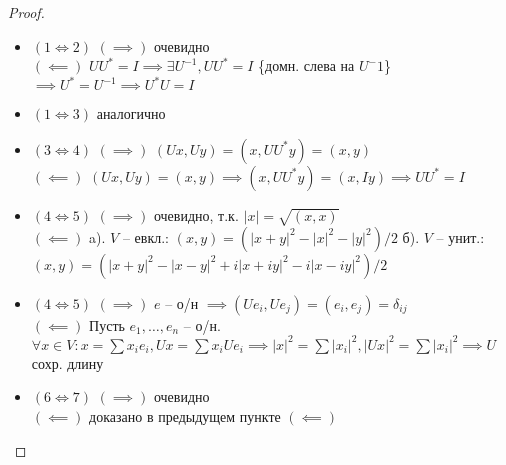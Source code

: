 \begin{proof}
\begin{itemize}
\item $(1\Leftrightarrow 2)$ $(\implies)$ очевидно \\ $(\impliedby)$ $UU^*=I \implies \exists U^{-1}, UU^*=I$ \{домн. слева на $U^-1$\} $\implies U^*=U^{-1} \implies U^*U=I$ \\
\item $(1\Leftrightarrow 3)$ аналогично \\
\item $(3\Leftrightarrow 4)$ $(\implies)$ $(Ux, Uy)=(x,UU^*y)=(x,y)$ \\ $(\impliedby)$ $(Ux,Uy)=(x,y) \implies (x,UU^*y)=(x,Iy) \implies UU^*=I$ \\
\item $(4\Leftrightarrow 5)$ $(\implies)$ очевидно, т.к. $\left|x\right|=\sqrt{(x,x)}$ \\ $(\impliedby)$ a). $V$ -- евкл.: $(x,y)=(\left|x+y\right|^2-\left|x\right|^2-\left|y\right|^2)/2$ б). $V$ -- унит.: $(x,y)=(\left|x+y\right|^2-\left|x-y\right|^2+i\left|x+iy\right|^2-i\left|x-iy\right|^2)/2$ \\
\item $(4\Leftrightarrow 5)$ $(\implies)$ $e$ -- о/н $\implies (Ue_i,Ue_j)=(e_i,e_j)=\delta_{ij}$ \\ $(\impliedby)$ Пусть $e_1, \dots, e_n$ -- о/н. $\forall x \in V: x = \sum x_ie_i, Ux = \sum x_iUe_i \implies \left|x\right|^2 = \sum \left|x_i\right|^2, \left|Ux\right|^2 = \sum \left|x_i\right|^2 \implies U$ сохр. длину \\
\item $(6\Leftrightarrow 7)$ $(\implies)$ очевидно \\ $(\impliedby)$ доказано в предыдущем пункте $(\impliedby)$ \\
\end{itemize}
\end{proof}

